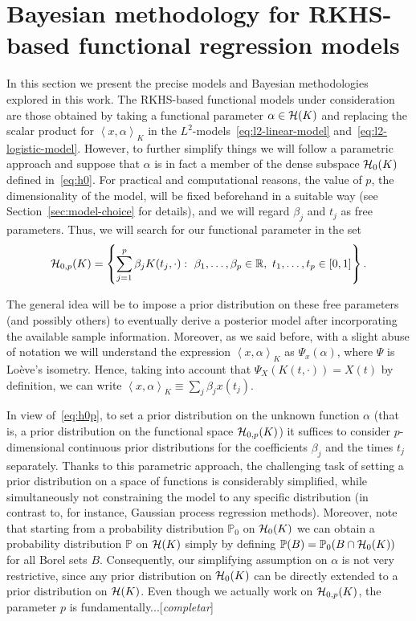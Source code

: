 \documentclass[ba]{imsart}
\numberwithin{equation}{section}
\theoremstyle{plain}
\newcommand{\R}{\mathbb{R}}
\newcommand{\Hcal}{\ensuremath\mathcal{H}}
\newcommand\dotprod[2]{\left\langle #1, #2 \right\rangle}
\newcommand\incomment[2][comment-red]{\color{#1}[\textit{#2}]\color{black}}
\begin{document}
\section{Bayesian methodology for RKHS-based functional regression models}\label{sec:methodology}

In this section we present the precise models and Bayesian methodologies explored in this work. The RKHS-based functional models under consideration are those obtained by taking a functional parameter \(\alpha \in \Hcal(K)\) and replacing the scalar product for \(\dotprod{x}{\alpha}_K\) in the \(L^2\)-models~\eqref{eq:l2-linear-model} and~\eqref{eq:l2-logistic-model}. However, to further simplify things we will follow a parametric approach and suppose that \(\alpha\) is in fact a member of the dense subspace \(\Hcal_0(K)\) defined in~\eqref{eq:h0}. For practical and computational reasons, the value of \(p\), the dimensionality of the model, will be fixed beforehand in a suitable way (see Section~\ref{sec:model-choice} for details), and we will regard \(\beta_j\) and \(t_j\) as free parameters. Thus, we will search for our functional parameter in the set
\begin{equation}\label{eq:h0p}
\Hcal_{0,p}(K)=\left\{ \sum_{j=1}^p \beta_j K(t_j, \cdot): \ \beta_1,\dots,\beta_p \in \R, \ t_1,\dots,t_p \in [0, 1]\right\}.
\end{equation}

The general idea will be to impose a prior distribution on these free parameters (and possibly others) to eventually derive a posterior model after incorporating the available sample information.  Moreover, as we said before, with a slight abuse of notation we will understand the expression \(\dotprod{x}{\alpha}_K\) as \(\Psi_x(\alpha)\), where \(\Psi\) is Loève's isometry. Hence, taking into account that \(\Psi_X(K(t, \cdot)) = X(t)\) by definition, we can write \(\dotprod{x}{\alpha}_K \equiv \sum_j \beta_j x(t_j)\).

In view of~\eqref{eq:h0p}, to set a prior distribution on the unknown function \(\alpha\) (that is, a prior distribution on the functional space \(\Hcal_{0,p}(K)\)) it suffices to consider \(p\)-dimensional continuous prior distributions for the coefficients \(\beta_j\) and the times \(t_j\) separately. Thanks to this parametric approach, the challenging task of setting a prior distribution on a space of functions is considerably simplified, while simultaneously not constraining the model to any specific distribution (in contrast to, for instance, Gaussian process regression methods). Moreover, note that starting from a probability distribution \(\mathbb{P}_0\) on \(\Hcal_0(K)\) we can obtain a probability distribution \(\mathbb{P}\) on \(\Hcal(K)\) simply by defining \(\mathbb{P}(B) = \mathbb{P}_0(B\cap \Hcal_0(K))\) for all Borel sets \(B\). Consequently, our simplifying assumption on \(\alpha\) is not very restrictive, since any prior distribution on \(\Hcal_0(K)\) can be directly extended to a prior distribution on \(\Hcal(K)\). Even though we actually work on \(\Hcal_{0,p}(K)\), the parameter \(p\) is fundamentally...\incomment{completar}
\end{document}

